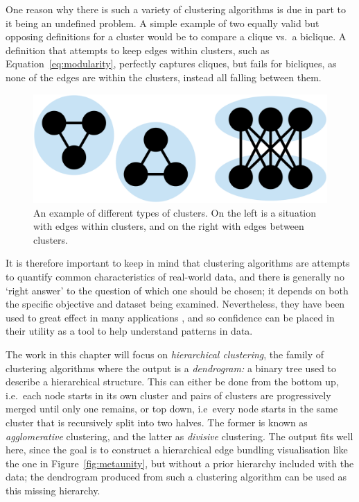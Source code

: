 One reason why there is such a variety of clustering algorithms is due in part to it being an undefined problem. A simple example of two equally valid but opposing definitions for a cluster would be to compare a clique vs.\ a biclique. A definition that attempts to keep edges within clusters, such as Equation~\ref{eq:modularity}, perfectly captures cliques, but fails for bicliques, as none of the edges are within the clusters, instead all falling between them.
\begin{figure}
  \centering
  \includegraphics[width=.8\textwidth]{power/clique_vs_biclique.pdf}
  \caption[Two examples for why clustering is difficult to define]{An example of different types of clusters. On the left is a situation with edges within clusters, and on the right with edges between clusters.}
  \label{fig:clique_vs_biclique}
\end{figure}
It is therefore important to keep in mind that clustering algorithms are attempts to quantify common characteristics of real-world data, and there is generally no `right answer' to the question of which one should be chosen; it depends on both the specific objective and dataset being examined. 
Nevertheless, they have been used to great effect in many applications \cite{Fortunato2016}, and so confidence can be placed in their utility as a tool to help understand patterns in data.

The work in this chapter will focus on \emph{hierarchical clustering}, the family of clustering algorithms where the output is a \textit{dendrogram:} a binary tree used to describe a hierarchical structure.
This can either be done from the bottom up, i.e.\ each node starts in its own cluster and pairs of clusters are progressively merged until only one remains, or top down, i.e\ every node starts in the same cluster that is recursively split into two halves. The former is known as \emph{agglomerative} clustering, and the latter as \emph{divisive} clustering.
The output fits well here, since the goal is to construct a hierarchical edge bundling visualisation like the one in Figure~\ref{fig:metaunity}, but without a prior hierarchy included with the data; the dendrogram produced from such a clustering algorithm can be used as this missing hierarchy.

